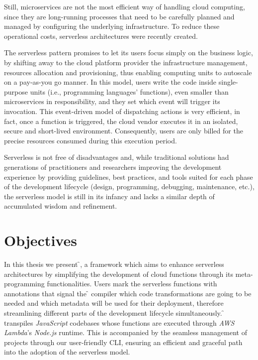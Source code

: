 Still, microservices are not the most efficient way of handling cloud computing,
since they are long-running processes that need to be carefully planned and managed
by configuring the underlying infrastructure. To reduce these operational costs,
serverless architectures were recently created.

The serverless pattern promises to let its users focus simply on the business logic,
by shifting away to the cloud platform provider the infrastructure management,
resources allocation and provisioning, thus enabling computing units to autoscale on a pay-as-you go manner.
In this model, users write the code inside single-purpose units (i.e., programming languages' functions),
even smaller than microservices in responsibility,
and they set which event will trigger its invocation.
This event-driven model of dispatching actions is very efficient, in fact,
once a function is triggered, the cloud vendor executes it in an isolated, secure and short-lived environment.
Consequently, users are only billed for the precise resources consumed during this execution period.

Serverless is not free of disadvantages and, while traditional solutions
had generations of practitioners and researchers improving the development experience
by providing guidelines, best practices, and tools suited for each phase
of the development lifecycle (design, programming, debugging, maintenance, etc.),
the serverless model is still in its infancy and lacks a similar depth of accumulated wisdom and refinement.

\section{Objectives} %

In this thesis we present \f{}, a framework which aims to enhance serverless architectures
by simplifying the development of cloud functions through its meta-programming functionalities.
Users mark the serverless functions with annotations that signal the \f{} compiler
which code transformations are going to be needed and which metadata will be used
for their deployment, therefore streamlining different parts of the development lifecycle simultaneously.
\f{} transpiles \textit{JavaScript} codebases whose functions are executed
through \textit{AWS Lambda}'s \textit{Node.js} runtime.
This is accompanied by the seamless management of projects
through our user-friendly CLI, ensuring an efficient and graceful path
into the adoption of the serverless model.

